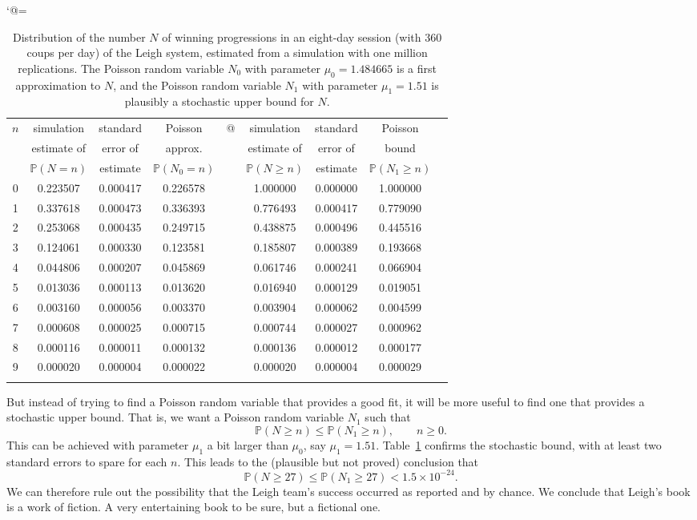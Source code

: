 \documentclass{article}
\theoremstyle{definition}
\theoremstyle{remark}
\renewcommand{\P}{\mathbb{P}}
\begin{document}
\begin{table}[htb]
\caption{Distribution of the number $N$ of winning progressions in an eight-day session (with 360 coups per day) of the Leigh system, estimated from a simulation with one million replications.  The Poisson random variable $N_0$ with parameter $\mu_0=1.484665$ is a first approximation to $N$, and the Poisson random variable $N_1$ with parameter $\mu_1=1.51$ is plausibly a stochastic upper bound for $N$. \label{tab:distrib-of-no-of-wins}}
\catcode`@=\active{}
\tabcolsep=1.5mm
\begin{center}
\begin{tabular}{ccccccccc}
\hline\noalign{\smallskip}
$n$ & simulation & standard & Poisson &@& simulation & standard & Poisson \\
    & estimate of & error of & approx. && estimate of & error of & bound \\
    & $\P(N=n)$ & estimate & $\P(N_0=n)$ && $\P(N\ge n)$ & estimate & $\P(N_1\ge n)$ \\
\noalign{\smallskip}\hline\noalign{\smallskip}
0 & 0.223507 & 0.000417 &  0.226578  && 1.000000 & 0.000000 & 1.000000 \\
1 & 0.337618 & 0.000473 &  0.336393  && 0.776493 & 0.000417 & 0.779090 \\
2 & 0.253068 & 0.000435 &  0.249715  && 0.438875 & 0.000496 & 0.445516 \\
3 & 0.124061 & 0.000330 &  0.123581  && 0.185807 & 0.000389 & 0.193668 \\
4 & 0.044806 & 0.000207 &  0.045869  && 0.061746 & 0.000241 & 0.066904 \\
5 & 0.013036 & 0.000113 &  0.013620  && 0.016940 & 0.000129 & 0.019051 \\
6 & 0.003160 & 0.000056 &  0.003370  && 0.003904 & 0.000062 & 0.004599 \\
7 & 0.000608 & 0.000025 &  0.000715  && 0.000744 & 0.000027 & 0.000962 \\
8 & 0.000116 & 0.000011 &  0.000132  && 0.000136 & 0.000012 & 0.000177 \\
9 & 0.000020 & 0.000004 &  0.000022  && 0.000020 & 0.000004 & 0.000029 \\
\noalign{\smallskip}\hline
\end{tabular}
\end{center}
\end{table}

But instead of trying to find a Poisson random variable that provides a good fit, it will be more useful to find one that provides a stochastic upper bound.  That is, we want a Poisson random variable $N_1$ such that
\[
\P(N\ge n)\le \P(N_1\ge n),\qquad n\ge0.
\]
This can be achieved with parameter $\mu_1$ a bit larger than $\mu_0$, say $\mu_1=1.51$.  Table~\ref{tab:distrib-of-no-of-wins} confirms the stochastic bound, with at least two standard errors to spare for each $n$.  This leads to the (plausible but not proved) conclusion that
\[
\P(N\ge27)\le\P(N_1\ge27)<1.5\times10^{-24}.
\]
We can therefore rule out the possibility that the Leigh team's success occurred as reported and by chance.  We conclude that Leigh's book is a work of fiction.  A very entertaining book to be sure, but a fictional one.  
\end{document}
